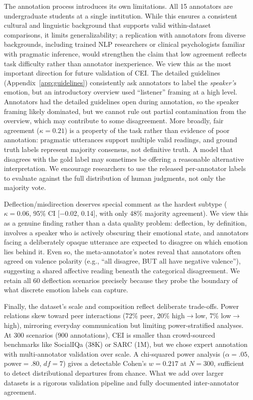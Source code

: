 \documentclass[twoside,11pt]{article}
\begin{document}
The annotation process introduces its own limitations. All 15 annotators are undergraduate students at a single institution. While this ensures a consistent cultural and linguistic background that supports valid within-dataset comparisons, it limits generalizability; a replication with annotators from diverse backgrounds, including trained NLP researchers or clinical psychologists familiar with pragmatic inference, would strengthen the claim that low agreement reflects task difficulty rather than annotator inexperience. We view this as the most important direction for future validation of CEI. The detailed guidelines (Appendix~\ref{app:guidelines}) consistently ask annotators to label the \textit{speaker's} emotion, but an introductory overview used ``listener'' framing at a high level. Annotators had the detailed guidelines open during annotation, so the speaker framing likely dominated, but we cannot rule out partial contamination from the overview, which may contribute to some disagreement. More broadly, fair agreement ($\kappa = 0.21$) is a property of the task rather than evidence of poor annotation: pragmatic utterances support multiple valid readings, and ground truth labels represent majority consensus, not definitive truth. A model that disagrees with the gold label may sometimes be offering a reasonable alternative interpretation. We encourage researchers to use the released per-annotator labels to evaluate against the full distribution of human judgments, not only the majority vote.

Deflection/misdirection deserves special comment as the hardest subtype ($\kappa = 0.06$, 95\% CI [$-$0.02, 0.14], with only 48\% majority agreement). We view this as a genuine finding rather than a data quality problem: deflection, by definition, involves a speaker who is actively obscuring their emotional state, and annotators facing a deliberately opaque utterance are expected to disagree on which emotion lies behind it. Even so, the meta-annotator's notes reveal that annotators often agreed on valence polarity (e.g., ``all disagree, BUT all have negative valence''), suggesting a shared affective reading beneath the categorical disagreement. We retain all 60 deflection scenarios precisely because they probe the boundary of what discrete emotion labels can capture.

Finally, the dataset's scale and composition reflect deliberate trade-offs. Power relations skew toward peer interactions (72\% peer, 20\% high$\rightarrow$low, 7\% low$\rightarrow$high), mirroring everyday communication but limiting power-stratified analyses. At 300 scenarios (900 annotations), CEI is smaller than crowd-sourced benchmarks like SocialIQa (38K) or SARC (1M), but we chose expert annotation with multi-annotator validation over scale. A chi-squared power analysis ($\alpha=.05$, power$=.80$, $df=7$) gives a detectable Cohen's $w=0.217$ at $N=300$, sufficient to detect distributional departures from chance. What we add over larger datasets is a rigorous validation pipeline and fully documented inter-annotator agreement.
\end{document}
